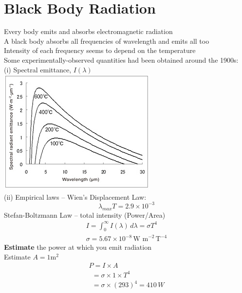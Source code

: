 \documentclass[a4paper, 11pt, fleqn, normalem]{report}
\begin{document}
\section{Black Body Radiation}
Every body emits and absorbs electromagnetic radiation \\
A black body absorbs all frequencies of wavelength and emits all too \\
Intensity of each frequency seems to depend on the temperature \\
Some experimentally-observed quantities had been obtained around the 1900s: \\
(i) Spectral emittance, $I(\lambda)$ \\
\includegraphics{SpectralEmit.jpg} \\
(ii) Empirical laws -- Wien's Displacement Law:
\begin{equation*}
    \lambda_{max}T = 2.9\times10^{-3}
\end{equation*}
Stefan-Boltzmann Law -- total intensity (Power/Area)
\begin{gather*}
    I = \int_{0}^{\infty} I(\lambda)\,d\lambda = \sigma T^{4} \\
    \sigma = 5.67\times10^{-8}\,\text{W m}^{-2}\,\text{T}^{-4}
\end{gather*}
\textbf{Estimate} the power at which you emit radiation \\
Estimate $A = 1$m$^{2}$
\begin{gather*}
    P = I \times A \\
    ~~ = \sigma \times 1 \times T^{4} \\
    ~~ = \sigma \times (293)^{4} = 410\,W
\end{gather*}
\end{document}
